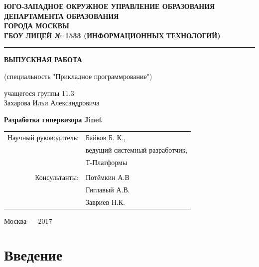 \documentclass[a4paper,12pt]{extarticle}
\begin{document}
{
	\begin{titlepage}
		\centering
		\textbf{\uppercase{ЮГО-ЗАПАДНОЕ ОКРУЖНОЕ УПРАВЛЕНИЕ ОБРАЗОВАНИЯ\\ДЕПАРТАМЕНТА ОБРАЗОВАНИЯ\\ГОРОДА МОСКВЫ\\\vspace{0.5cm}ГБОУ Лицей № 1533 (информационных технологий)}}\par
		\rule{\textwidth}{1pt}\par
		\vspace{2.25cm}
		\large\textbf{ВЫПУСКНАЯ РАБОТА}\par
		\vspace{0.5cm}
		\large(специальность "Прикладное программрование")\par
		\vspace{0.5cm}
		\large{учащегося группы 11.3\\Захарова Ильи Александровича}\par
		\vspace{2cm}
		{\Huge{\textbf{Разработка гипервизора Jinet}}}\par
		\vspace{3cm}
		\begin{flushright}
			\begin{tabular}{rl}
				Научный руководитель:& Байков Б. К.,\\
									 & ведущий системный разработчик,\\
									 & \flqq Т-Платформы\frqq\\
									 & \\
						Консультанты:& Потёмкин А.В\\
									 & Гиглавый А.В.\\
									 & Завриев Н.К.\\
				
			\end{tabular}
		\end{flushright}
		\par
		\vfill
		Москва --- 2017
	\end{titlepage}
}
	\linespread{2.5}
	\tableofcontents
	\linespread{1.5}
	\pagebreak
	\section{Введение}
	
\end{document}
